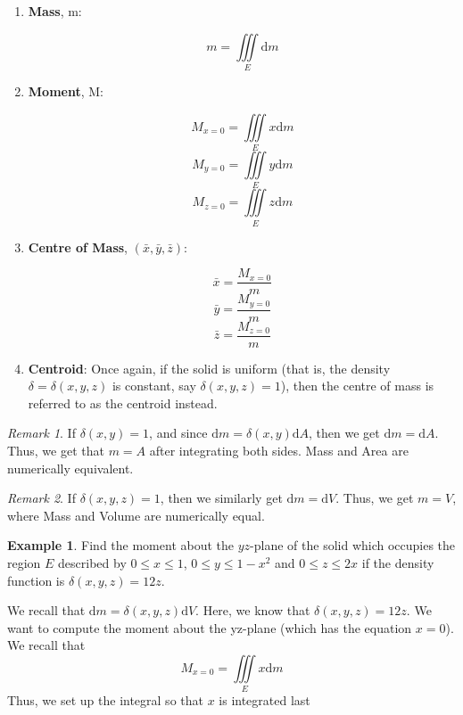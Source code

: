 \documentclass[11pt]{article}
\theoremstyle{plain} %
\theoremstyle{definition}
\theoremstyle{example}
\newtheorem*{example}{Example}
\theoremstyle{remark}
\newtheorem*{remark}{Remark}
\begin{document}
\begin{enumerate}
	\item \textbf{Mass}, m:
	
	$$m = \iiint\limits_E\mathrm d m$$
	\item \textbf{Moment}, M:
	
	$$M_{x=0} = \iiint \limits_E x \mathrm d m$$ 
	$$M_{y=0} = \iiint \limits_E y \mathrm d m$$ 
	$$M_{z=0} = \iiint \limits_E z \mathrm d m$$ 
	
	\item \textbf{Centre of Mass}, $(\bar{x}, \bar{y}, \bar{z})$: 
	
	$$\bar{x} = \frac{M_{x=0}}{m}$$
	$$\bar{y} = \frac{M_{y=0}}{m}$$
	$$\bar{z} = \frac{M_{z=0}}{m}$$
	\item \textbf{Centroid}: Once again, if the solid is uniform (that is, the density $\delta =\delta (x, y, z)$ is constant, say $\delta (x, y, z) = 1$), then the centre of mass is referred to as the centroid instead.
\end{enumerate}




\begin{remark}
If $\delta(x, y) = 1$, and since $\mathrm d m = \delta(x,y)\mathrm d A$, then we get $\mathrm d m = \mathrm d A$. Thus, we get that $m=A$ after integrating both sides. Mass and Area are numerically equivalent. 
\end{remark}

\begin{remark}
If $\delta(x, y, z) = 1$, then we similarly get $\mathrm d m = \mathrm d V$. Thus, we get $m=V$, where Mass and Volume are numerically equal.
\end{remark}

\begin{example}
Find the moment about the $yz$-plane of the solid which occupies the region $E$ described by $0 \leq x \leq 1$, $0 \leq y \leq 1-x^2$ and $0 \leq z \leq 2x$ if the density function is $\delta(x, y, z) = 12z$.

\end{example}

We recall that $\mathrm d m = \delta(x, y, z) \mathrm d V$. Here, we know that $\delta(x, y, z) = 12z$. We want to compute the moment about the yz-plane (which has the equation $x=0$). We recall that $$M_{x=0} = \iiint \limits_E x \mathrm d m $$ Thus, we set up the integral so that $x$ is integrated last
\end{document}
